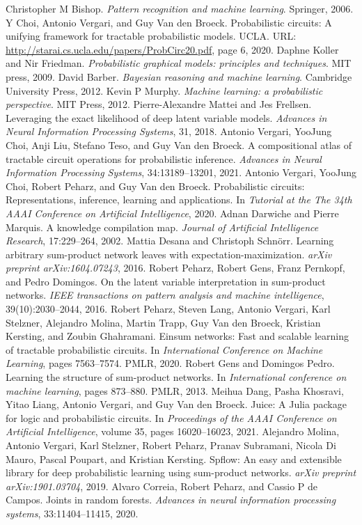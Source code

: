 \begin{chapterreferences}
 Christopher M Bishop. \emph{Pattern recognition and machine learning}. Springer, 2006.
 Y Choi, Antonio Vergari, and Guy Van den Broeck. Probabilistic circuits: A unifying framework for tractable probabilistic models. UCLA. URL: \url{http://starai.cs.ucla.edu/papers/ProbCirc20.pdf}, page 6, 2020.
 Daphne Koller and Nir Friedman. \emph{Probabilistic graphical models: principles and techniques}. MIT press, 2009.
 David Barber. \emph{Bayesian reasoning and machine learning}. Cambridge University Press, 2012.
 Kevin P Murphy. \emph{Machine learning: a probabilistic perspective}. MIT Press, 2012.
 Pierre-Alexandre Mattei and Jes Frellsen. Leveraging the exact likelihood of deep latent variable models. \emph{Advances in Neural Information Processing Systems}, 31, 2018.
 Antonio Vergari, YooJung Choi, Anji Liu, Stefano Teso, and Guy Van den Broeck. A compositional atlas of tractable circuit operations for probabilistic inference. \emph{Advances in Neural Information Processing Systems}, 34:13189–13201, 2021.
 Antonio Vergari, YooJung Choi, Robert Peharz, and Guy Van den Broeck. Probabilistic circuits: Representations, inference, learning and applications. In \emph{Tutorial at the The 34th AAAI Conference on Artificial Intelligence}, 2020.
 Adnan Darwiche and Pierre Marquis. A knowledge compilation map. \emph{Journal of Artificial Intelligence Research}, 17:229–264, 2002.
 Mattia Desana and Christoph Schnörr. Learning arbitrary sum-product network leaves with expectation-maximization. \emph{arXiv preprint arXiv:1604.07243}, 2016.
 Robert Peharz, Robert Gens, Franz Pernkopf, and Pedro Domingos. On the latent variable interpretation in sum-product networks. \emph{IEEE transactions on pattern analysis and machine intelligence}, 39(10):2030–2044, 2016.
 Robert Peharz, Steven Lang, Antonio Vergari, Karl Stelzner, Alejandro Molina, Martin Trapp, Guy Van den Broeck, Kristian Kersting, and Zoubin Ghahramani. Einsum networks: Fast and scalable learning of tractable probabilistic circuits. In \emph{International Conference on Machine Learning}, pages 7563–7574. PMLR, 2020.
 Robert Gens and Domingos Pedro. Learning the structure of sum-product networks. In \emph{International conference on machine learning}, pages 873–880. PMLR, 2013.
 Meihua Dang, Pasha Khosravi, Yitao Liang, Antonio Vergari, and Guy Van den Broeck. Juice: A Julia package for logic and probabilistic circuits. In \emph{Proceedings of the AAAI Conference on Artificial Intelligence}, volume 35, pages 16020–16023, 2021.
 Alejandro Molina, Antonio Vergari, Karl Stelzner, Robert Peharz, Pranav Subramani, Nicola Di Mauro, Pascal Poupart, and Kristian Kersting. Spflow: An easy and extensible library for deep probabilistic learning using sum-product networks. \emph{arXiv preprint arXiv:1901.03704}, 2019.
 Alvaro Correia, Robert Peharz, and Cassio P de Campos. Joints in random forests. \emph{Advances in neural information processing systems}, 33:11404–11415, 2020.
\end{chapterreferences}
